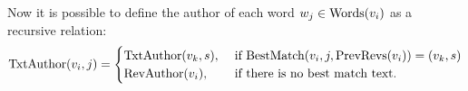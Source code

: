 Now it is possible to define the author of each word
$w_j \in \mathrm{Words}(v_{i})$ as a recursive relation:
\begin{equation}
\txtauthor{\version{i}, j} =
    \begin{cases}
	\txtauthor{\version{k}, s}, & \text{ if }
	\match{\version{i}, j, \prevrevs{\version{i}}} = (\version{k}, s) \\
	\revauthor{\version{i}}, & \text{ if there is no best match text. } \\
    \end{cases}
\label{def:txtauthor}
\end{equation}

